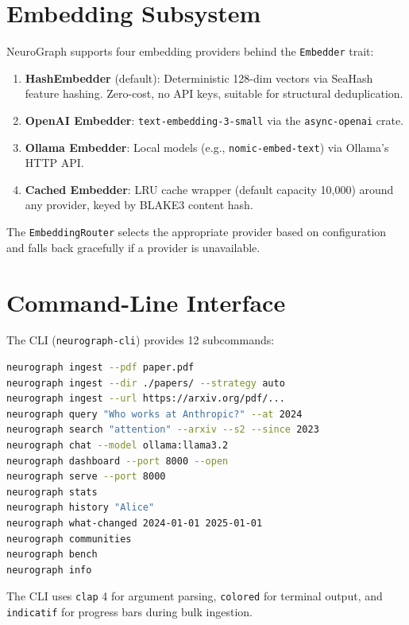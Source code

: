 \documentclass[11pt,a4paper,twocolumn]{article}
\begin{document}
\section{Embedding Subsystem}
\label{sec:embedders}

NeuroGraph supports four embedding providers behind the
\texttt{Embedder} trait:

\begin{enumerate}[leftmargin=*]
  \item \textbf{HashEmbedder} (default): Deterministic 128-dim
    vectors via SeaHash feature hashing. Zero-cost, no API keys,
    suitable for structural deduplication.
  \item \textbf{OpenAI Embedder}: \texttt{text-embedding-3-small}
    via the \texttt{async-openai} crate.
  \item \textbf{Ollama Embedder}: Local models (e.g.,
    \texttt{nomic-embed-text}) via Ollama's HTTP API.
  \item \textbf{Cached Embedder}: LRU cache wrapper (default
    capacity 10,000) around any provider, keyed by BLAKE3 content
    hash.
\end{enumerate}

The \texttt{EmbeddingRouter} selects the appropriate provider
based on configuration and falls back gracefully if a provider
is unavailable.

\section{Command-Line Interface}
\label{sec:cli}

The CLI (\texttt{neurograph-cli}) provides 12 subcommands:

\begin{lstlisting}[language=bash,style={}]
neurograph ingest --pdf paper.pdf
neurograph ingest --dir ./papers/ --strategy auto
neurograph ingest --url https://arxiv.org/pdf/...
neurograph query "Who works at Anthropic?" --at 2024
neurograph search "attention" --arxiv --s2 --since 2023
neurograph chat --model ollama:llama3.2
neurograph dashboard --port 8000 --open
neurograph serve --port 8000
neurograph stats
neurograph history "Alice"
neurograph what-changed 2024-01-01 2025-01-01
neurograph communities
neurograph bench
neurograph info
\end{lstlisting}

The CLI uses \texttt{clap} 4 for argument parsing, \texttt{colored}
for terminal output, and \texttt{indicatif} for progress bars during
bulk ingestion.
\end{document}
